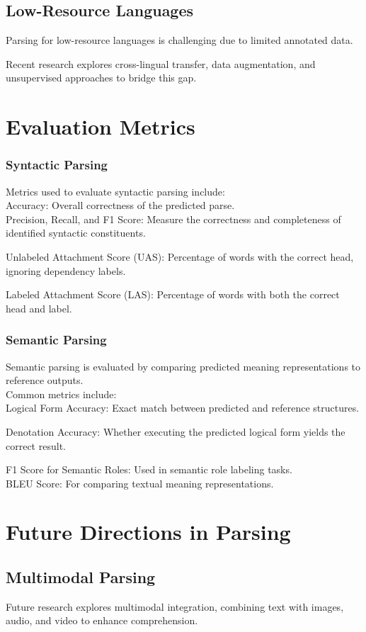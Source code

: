 \documentclass[10pt]{article}
\begin{document}
\subsection*{Low-Resource Languages}
Parsing for low-resource languages is challenging due to limited annotated data.

Recent research explores cross-lingual transfer, data augmentation, and unsupervised approaches to bridge this gap.

\section*{Evaluation Metrics}
\subsubsection*{Syntactic Parsing}
Metrics used to evaluate syntactic parsing include:\\
Accuracy: Overall correctness of the predicted parse.\\
Precision, Recall, and F1 Score: Measure the correctness and completeness of identified syntactic constituents.

Unlabeled Attachment Score (UAS): Percentage of words with the correct head, ignoring dependency labels.

Labeled Attachment Score (LAS): Percentage of words with both the correct head and label.

\subsubsection*{Semantic Parsing}
Semantic parsing is evaluated by comparing predicted meaning representations to reference outputs.\\
Common metrics include:\\
Logical Form Accuracy: Exact match between predicted and reference structures.

Denotation Accuracy: Whether executing the predicted logical form yields the correct result.

F1 Score for Semantic Roles: Used in semantic role labeling tasks.\\
BLEU Score: For comparing textual meaning representations.

\section*{Future Directions in Parsing}
\subsection*{Multimodal Parsing}
Future research explores multimodal integration, combining text with images, audio, and video to enhance comprehension.
\end{document}
